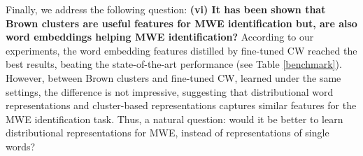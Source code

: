 Finally, we address the following question: \textbf{(vi) It has been shown that Brown clusters are useful features for MWE identification but, are also word embeddings helping MWE identification?} 
According to our experiments, the word embedding features distilled by fine-tuned CW reached the best results, beating the state-of-the-art performance (see Table \ref{benchmark}).
However, between Brown clusters and fine-tuned CW, learned under the same settings, the difference is not impressive, suggesting that distributional word representations and cluster-based representations captures similar features for the MWE identification task.
Thus, a natural question: would it be better to learn distributional representations for MWE, instead of representations of single words?








